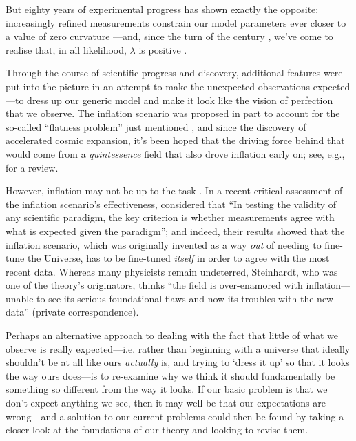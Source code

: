 \documentclass[12 pt]{article}
\begin{document}
But eighty years of experimental progress has shown exactly the opposite: increasingly refined measurements constrain our model parameters ever closer to a value of zero curvature \citep{Hinshaw2013,Ade2013}---and, since the turn of the century \citep{Riess1998,Perlmutter1999}, we've come to realise that, in all likelihood, $\lambda$ is positive \citep{Riess2004,Riess2007,Davis2007,Hicken2009,Riess2011,Suzuki2012,Hinshaw2013,Ade2013}.

Through the course of scientific progress and discovery, additional features were put into the picture in an attempt to make the unexpected observations expected---to dress up our generic model and make it look like the vision of perfection that we observe. The inflation scenario was proposed in part to account for the so-called ``flatness problem'' just mentioned \citep{Guth1981}, and since the discovery of accelerated cosmic expansion, it's been hoped that the driving force behind that would come from a \textit{quintessence} field that also drove inflation early on; see, e.g., \citet{Weinberg2008} for a review. 

However, inflation may not be up to the task \citep{Steinhardt2011}. In a recent critical assessment of the inflation scenario's effectiveness, \citet{Ijjas2013} considered that ``In testing the validity of any scientific paradigm, the key criterion is whether measurements agree with what is expected given the paradigm''; and indeed, their results showed that the inflation scenario, which was originally invented as a way \textit{out} of needing to fine-tune the Universe, has to be fine-tuned \textit{itself} in order to agree with the most recent data. Whereas many physicists remain undeterred, Steinhardt, who was one of the theory's originators, thinks ``the field is over-enamored with inflation---unable to see its serious foundational flaws and now its troubles with the new data'' (private correspondence). 

Perhaps an alternative approach to dealing with the fact that little of what we observe is really expected---i.e. rather than beginning with a universe that ideally shouldn't be at all like ours \textit{actually} is, and trying to `dress it up' so that it looks the way ours does---is to re-examine why we think it should fundamentally be something so different from the way it looks. If our basic problem is that we don't expect anything we see, then it may well be that our expectations are wrong---and a solution to our current problems could then be found by taking a closer look at the foundations of our theory and looking to revise them. 
\end{document}
